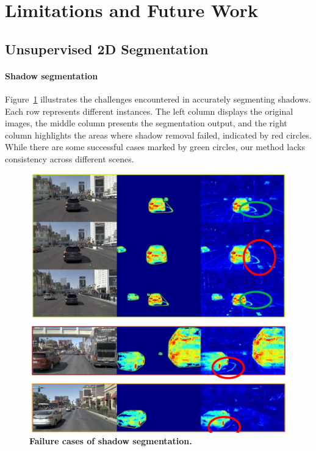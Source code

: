 \clearpage
\section{Limitations and Future Work}
\label{sec:limitation-appendix}


\subsection{Unsupervised 2D Segmentation}
\paragraph{Shadow segmentation} Figure~\ref{fig:limitation-shadow-appendix} illustrates the challenges encountered in accurately segmenting shadows. Each row represents different instances. The left column displays the original images, the middle column presents the segmentation output, and the right column highlights the areas where shadow removal failed, indicated by red circles. While there are some successful cases marked by green circles, our method lacks consistency across different scenes. 

\begin{figure}[ht]
    \centering
    \includegraphics[width=0.66\linewidth]{figs_compressed/limitation-shadow_compressed.pdf}
    \caption{\textbf{Failure cases of shadow segmentation.}}
    \label{fig:limitation-shadow-appendix}
    \vspace{-2mm}
\end{figure}


